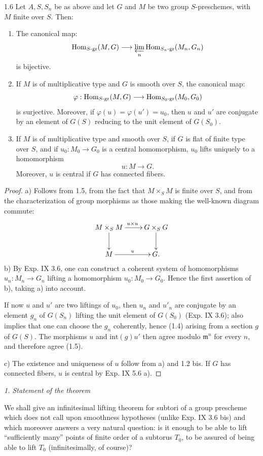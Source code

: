 \begin{proposition}{1.6}\label{XV.1.6}
Let $A,S,S_n$ be as above and let $G$ and $M$ be two group $S$-preschemes, with $M$ finite over $S$. Then:
\begin{enumerate}[label=\textup{\alph*)}]
\item The canonical map:
\[
\operatorname{Hom}_{S\text{-gr}}(M,G)\longrightarrow\varprojlim_n\operatorname{Hom}_{S_n\text{-gr}}(M_n,G_n)
\]
is bijective.
\item If $M$ is of multiplicative type and $G$ is smooth over $S$, the canonical map:
\[
\varphi:\operatorname{Hom}_{S\text{-gr}}(M,G)\longrightarrow\operatorname{Hom}_{S_0\text{-gr}}(M_0,G_0)
\]
is surjective. Moreover, if $\varphi(u)=\varphi(u')=u_0$, then $u$ and $u'$ are conjugate by an element of $G(S)$ reducing to the unit element of $G(S_0)$.
\item If $M$ is of multiplicative type and smooth over $S$, if $G$ is flat of finite type over $S$, and if $u_0:M_0\to G_0$ is a central homomorphism, $u_0$ lifts uniquely to a homomorphism
\[
u:M\to G.
\]
Moreover, $u$ is central if $G$ has connected fibers.
\end{enumerate}
\end{proposition}
\begin{proof}
a) Follows from 1.5, from the fact that $M\times_S M$ is finite over $S$, and from the characterization of group morphisms as those making the well-known diagram commute:
\[
\xymatrix{M\times_S M\ar[r]^{u\times u}\ar[d]&G\times_S G\ar[d]\\M\ar[r]^u&G.}
\]
b) By Exp. IX 3.6, one can construct a coherent system of homomorphisms $u_n:M_n\to G_n$ lifting a homomorphism $u_0:M_0\to G_0$. Hence the first assertion of b), taking a) into account.

If now $u$ and $u'$ are two liftings of $u_0$, then $u_n$ and $u'_n$ are conjugate by an element $g_n$ of $G(S_n)$ lifting the unit element of $G(S_0)$ (Exp. IX 3.6); \loccit also implies that one can choose the $g_n$ coherently, hence (1.4) arising from a section $g$ of $G(S)$. The morphisms $u$ and $\mathrm{int}(g)u'$ then agree modulo $\mathfrak m^n$ for every $n$, and therefore agree (1.5).

c) The existence and uniqueness of $u$ follow from a) and 1.2 bis. If $G$ has connected fibers, $u$ is central by Exp. IX 5.6 a).
\end{proof}

\par\medskip\noindent\textit{1. Statement of the theorem}\par
We shall give an infinitesimal lifting theorem for subtori of a group prescheme which does not call upon smoothness hypotheses (unlike Exp. IX 3.6 bis) and which moreover answers a very natural question: is it enough to be able to lift ``sufficiently many'' points of finite order of a subtorus $T_0$, to be assured of being able to lift $T_0$ (infinitesimally, of course)?

